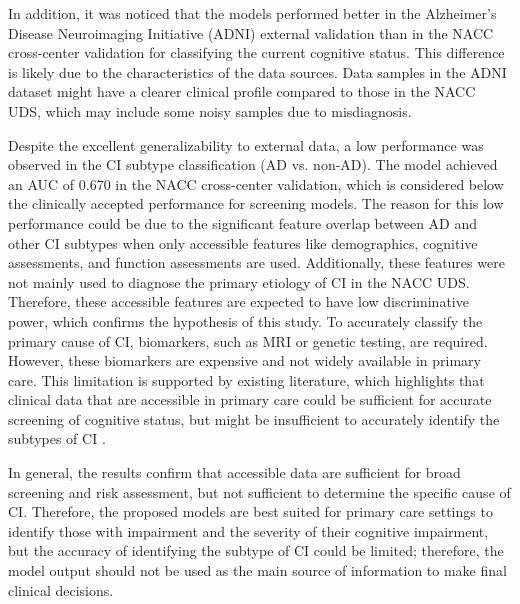 In addition, it was noticed that the models performed better in the Alzheimer's Disease Neuroimaging Initiative (\acrshort{ADNI}) external validation than in the NACC cross-center validation for classifying the current cognitive status. This difference is likely due to the characteristics of the data sources. Data samples in the ADNI dataset might have a clearer clinical profile compared to those in the NACC UDS, which may include some noisy samples due to misdiagnosis.

Despite the excellent generalizability to external data, a low performance was observed in the CI subtype classification (AD vs. non-AD). The model achieved an AUC of 0.670 in the NACC cross-center validation, which is considered below the clinically accepted performance for screening models. The reason for this low performance could be due to the significant feature overlap between AD and other CI subtypes when only accessible features like demographics, cognitive assessments, and function assessments are used. Additionally, these features were not mainly used to diagnose the primary etiology of CI in the NACC UDS. Therefore, these accessible features are expected to have low discriminative power, which confirms the hypothesis of this study. To accurately classify the primary cause of CI, biomarkers, such as MRI or genetic testing, are required. However, these biomarkers are expensive and not widely available in primary care. This limitation is supported by existing literature, which highlights that clinical data that are accessible in primary care could be sufficient for accurate screening of cognitive status, but might be insufficient to accurately identify the subtypes of CI \cite{Yineng2019Machine, Zhu2020Machine}.

In general, the results confirm that accessible data are sufficient for broad screening and risk assessment, but not sufficient to determine the specific cause of CI. Therefore, the proposed models are best suited for primary care settings to identify those with impairment and the severity of their cognitive impairment, but the accuracy of identifying the subtype of CI could be limited; therefore, the model output should not be used as the main source of information to make final clinical decisions.

